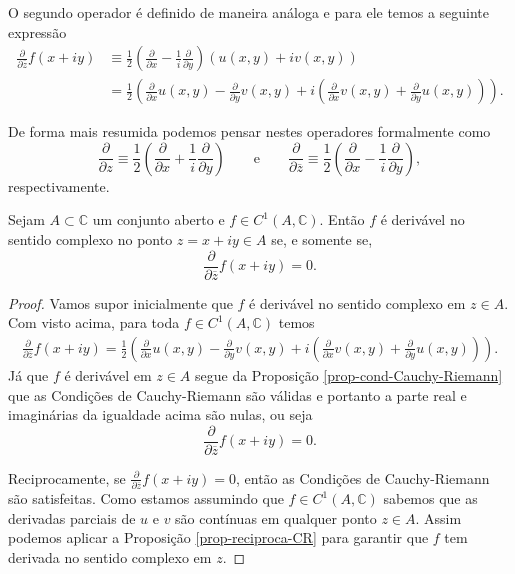 O segundo operador  é definido de maneira análoga e para ele temos a seguinte expressão
\begin{align*}
	\frac{\partial}{\partial \overline{z}}f(x+iy) 
	&\equiv
	\frac{1}{2}
	\left( 
	\frac{\partial}{\partial x} -\frac{1}{i}\frac{\partial  }{\partial y}\right)(u(x,y)+iv(x,y)) 
	\\
	&=
	\frac{1}{2}
	\left( 
	\frac{\partial}{\partial x}u(x,y) -\frac{\partial  }{\partial y}v(x,y) 
	+i
	\left( 
	\frac{\partial}{\partial x}v(x,y) 
	+\frac{\partial  }{\partial y}u(x,y) 
	\right)
	\right).
\end{align*}



De forma mais resumida podemos pensar nestes operadores formalmente como 
\[
\frac{\partial}{\partial z}  \equiv  \frac{1}{2}\left( \frac{\partial}{\partial x}+ \frac{1}{i}\frac{\partial}{\partial y} \right)
\qquad\text{e}\qquad
\frac{\partial}{\partial \overline{z}}  \equiv  \frac{1}{2}\left( \frac{\partial}{\partial x}-\frac{1}{i}\frac{\partial  }{\partial y} \right),
\]
respectivamente.

\begin{proposicao}
\label{prop-functional-CR}
Sejam $A\subset \mathbb{C}$ um conjunto aberto e $f\in C^1(A,\mathbb{C})$. 
Então $f$ é derivável no sentido complexo no ponto $z=x+iy\in A$
se, e somente se, 
\[
\frac{\partial}{\partial \overline{z}}f(x+iy) = 0.
\]
\end{proposicao}
\begin{proof}
Vamos supor inicialmente que $f$ é derivável no sentido complexo em $z\in A$.
Com visto acima, para toda $f\in C^1(A,\mathbb{C})$ temos
\begin{align*}
	\frac{\partial}{\partial \overline{z}}f(x+iy) 
=
	\frac{1}{2}
	\left( 
	\frac{\partial}{\partial x}u(x,y) -\frac{\partial  }{\partial y}v(x,y) 
	+i
	\left( 
	\frac{\partial}{\partial x}v(x,y) 
	+\frac{\partial  }{\partial y}u(x,y) 
	\right)
	\right).
\end{align*}
Já que $f$ é derivável em $z\in A$ segue da Proposição \ref{prop-cond-Cauchy-Riemann}
que as Condições de Cauchy-Riemann são válidas e portanto a parte real e imaginárias da igualdade
acima são nulas, ou seja 
\[
	\frac{\partial}{\partial \overline{z}}f(x+iy)  = 0.
\]

Reciprocamente, se $\frac{\partial}{\partial \overline{z}}f(x+iy) = 0$, então as Condições de Cauchy-Riemann
são satisfeitas. Como estamos assumindo que $f\in C^1(A,\mathbb{C})$ sabemos que as derivadas parciais
de $u$ e $v$ são contínuas em qualquer ponto $z\in A$. Assim podemos aplicar a Proposição \ref{prop-reciproca-CR}
para garantir que $f$ tem derivada no sentido complexo em $z$.
\end{proof}

